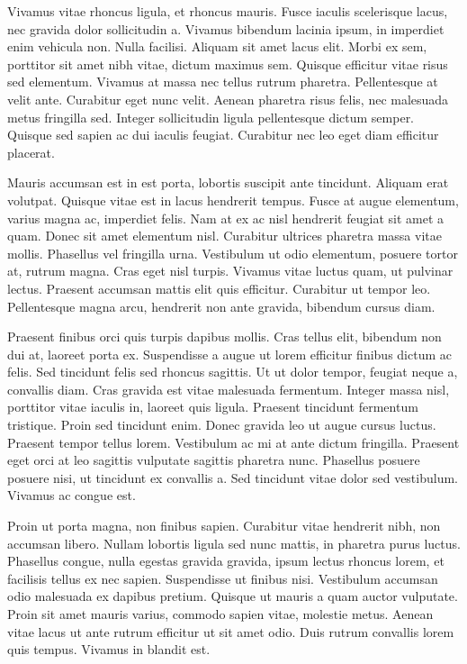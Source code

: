 Vivamus vitae rhoncus ligula, et rhoncus mauris. Fusce iaculis scelerisque lacus, nec gravida dolor sollicitudin a. Vivamus bibendum lacinia ipsum, in imperdiet enim vehicula non. Nulla facilisi. Aliquam sit amet lacus elit. Morbi ex sem, porttitor sit amet nibh vitae, dictum maximus sem. Quisque efficitur vitae risus sed elementum. Vivamus at massa nec tellus rutrum pharetra. Pellentesque at velit ante. Curabitur eget nunc velit. Aenean pharetra risus felis, nec malesuada metus fringilla sed. Integer sollicitudin ligula pellentesque dictum semper. Quisque sed sapien ac dui iaculis feugiat. Curabitur nec leo eget diam efficitur placerat.

Mauris accumsan est in est porta, lobortis suscipit ante tincidunt. Aliquam erat volutpat. Quisque vitae est in lacus hendrerit tempus. Fusce at augue elementum, varius magna ac, imperdiet felis. Nam at ex ac nisl hendrerit feugiat sit amet a quam. Donec sit amet elementum nisl. Curabitur ultrices pharetra massa vitae mollis. Phasellus vel fringilla urna. Vestibulum ut odio elementum, posuere tortor at, rutrum magna. Cras eget nisl turpis. Vivamus vitae luctus quam, ut pulvinar lectus. Praesent accumsan mattis elit quis efficitur. Curabitur ut tempor leo. Pellentesque magna arcu, hendrerit non ante gravida, bibendum cursus diam.

Praesent finibus orci quis turpis dapibus mollis. Cras tellus elit, bibendum non dui at, laoreet porta ex. Suspendisse a augue ut lorem efficitur finibus dictum ac felis. Sed tincidunt felis sed rhoncus sagittis. Ut ut dolor tempor, feugiat neque a, convallis diam. Cras gravida est vitae malesuada fermentum. Integer massa nisl, porttitor vitae iaculis in, laoreet quis ligula. Praesent tincidunt fermentum tristique. Proin sed tincidunt enim. Donec gravida leo ut augue cursus luctus. Praesent tempor tellus lorem. Vestibulum ac mi at ante dictum fringilla. Praesent eget orci at leo sagittis vulputate sagittis pharetra nunc. Phasellus posuere posuere nisi, ut tincidunt ex convallis a. Sed tincidunt vitae dolor sed vestibulum. Vivamus ac congue est.

Proin ut porta magna, non finibus sapien. Curabitur vitae hendrerit nibh, non accumsan libero. Nullam lobortis ligula sed nunc mattis, in pharetra purus luctus. Phasellus congue, nulla egestas gravida gravida, ipsum lectus rhoncus lorem, et facilisis tellus ex nec sapien. Suspendisse ut finibus nisi. Vestibulum accumsan odio malesuada ex dapibus pretium. Quisque ut mauris a quam auctor vulputate. Proin sit amet mauris varius, commodo sapien vitae, molestie metus. Aenean vitae lacus ut ante rutrum efficitur ut sit amet odio. Duis rutrum convallis lorem quis tempus. Vivamus in blandit est.

